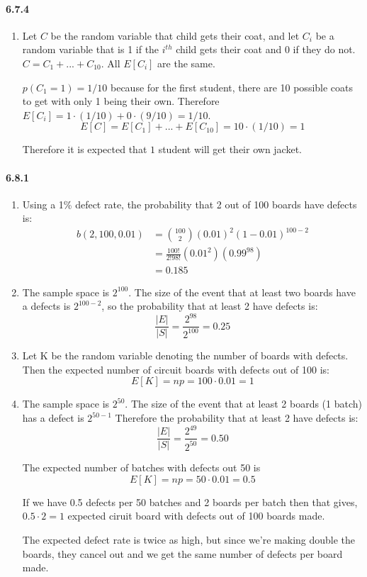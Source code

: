 \documentclass[11pt, letterpaper, twocolumn, fleqn]{article}
\begin{document}
\paragraph{6.7.4}
\begin{enumerate}
  \item Let $C$ be the random variable that child gets their coat, and let $C_i$ be a random variable that is 1 if the $i^{th}$ child gets their coat and 0 if they do not. $C = C_1 + ... + C_{10}$. All $E[C_i]$ are the same. 
  
  $p(C_1 = 1) = 1/10$ because for the first student, there are 10 possible coats to get with only 1 being their own. Therefore $E[C_i] = 1 \cdot (1/10) + 0 \cdot (9 / 10) = 1/10$.
    $$E[C] = E[C_1] + ... + E[C_10] = 10 \cdot (1/10) = 1$$
    
  Therefore it is expected that $1$ student will get their own jacket.
\end{enumerate}

\paragraph{6.8.1}
\begin{enumerate}
  \item Using a 1\% defect rate, the probability that 2 out of 100 boards have defects is:
  \begin{align*}
    b(2,100,0.01) &= \binom{100}{2}(0.01)^{2}(1-0.01)^{100-2} \\
      &= \frac{100!}{2!98!}(0.01^2)(0.99^98)\\
      &= 0.185
  \end{align*}
  
  \item The sample space is $2^{100}$. The size of the event that at least two boards have a defects is $2^{100-2}$, so the probability that at least 2 have defects is:
    $$\frac{|E|}{|S|} = \frac{2^{98}}{2^{100}} = 0.25$$
    
  \item Let K be the random variable denoting the number of boards with defects. Then the expected number of circuit boards with defects out of 100 is:
    $$E[K] = np =  100 \cdot 0.01 = 1$$
    
  \item The sample space is $2^{50}$. The size of the event that at least 2 boards (1 batch) has a defect is $2^{50-1}$ Therefore the probability that at least 2 have defects is:
    $$\frac{|E|}{|S|} = \frac{2^{49}}{2^{50}} = 0.50$$
    
  The expected number of batches with defects out 50 is
    $$E[K] = np = 50 \cdot 0.01 = 0.5 $$
    
  If we have 0.5 defects per 50 batches and 2 boards per batch then that gives, $0.5 \cdot 2 = 1$ expected ciruit board with defects out of 100 boards made. 
  
  The expected defect rate is twice as high, but since we're making double the boards, they cancel out and we get the same number of defects per board made.
\end{enumerate}
\end{document}
